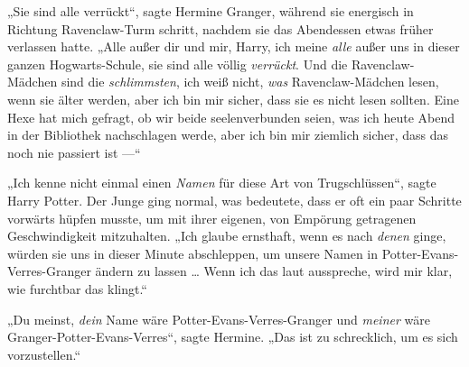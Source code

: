„Sie sind alle verrückt“, sagte Hermine Granger, während sie energisch in Richtung Ravenclaw-Turm schritt, nachdem sie das Abendessen etwas früher verlassen hatte.
„Alle außer dir und mir, Harry, ich meine \emph{alle} außer uns in dieser ganzen Hogwarts-Schule, sie sind alle völlig \emph{verrückt}. Und die Ravenclaw-Mädchen sind die \emph{schlimmsten}, ich weiß nicht, \emph{was} Ravenclaw-Mädchen lesen, wenn sie älter werden, aber ich bin mir sicher, dass sie es nicht lesen sollten. Eine Hexe hat mich gefragt, ob wir beide seelenverbunden seien, was ich heute Abend in der Bibliothek nachschlagen werde, aber ich bin mir ziemlich sicher, dass das noch nie passiert ist —“

„Ich kenne nicht einmal einen \emph{Namen} für diese Art von Trugschlüssen“, sagte Harry Potter. Der Junge ging normal, was bedeutete, dass er oft ein paar Schritte vorwärts hüpfen musste, um mit ihrer eigenen, von Empörung getragenen Geschwindigkeit mitzuhalten.
„Ich glaube ernsthaft, wenn es nach \emph{denen} ginge, würden sie uns in dieser Minute abschleppen, um unsere Namen in Potter-Evans-Verres-Granger ändern zu lassen … Wenn ich das laut ausspreche, wird mir klar, wie furchtbar das klingt.“

„Du meinst, \emph{dein} Name wäre Potter-Evans-Verres-Granger und \emph{meiner} wäre Granger-Potter-Evans-Verres“, sagte Hermine.
„Das ist zu schrecklich, um es sich vorzustellen.“

